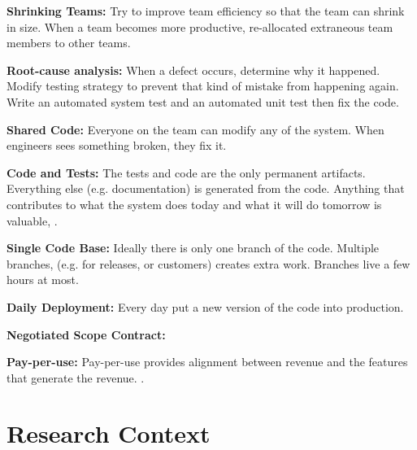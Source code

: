 \textbf{Shrinking Teams:} Try to improve team efficiency so that the team can shrink in size. When a team becomes more productive, re-allocated extraneous team members to other teams.




\textbf{Root-cause analysis:} When a defect occurs, determine why it happened. Modify testing strategy to prevent that kind of mistake from happening again. Write an automated system test and an automated unit test then fix the code. 


\textbf{Shared Code:} Everyone on the team can modify any of the system. When engineers sees something broken, they fix it.


\textbf{Code and Tests:} The tests and code are the only permanent artifacts. Everything else (e.g. documentation) is generated from the code. Anything that contributes to what the system does today and what it will do tomorrow is valuable,  
\cite{BeckExtremeProgramming2004}.


\textbf{Single Code Base:} Ideally there is only one branch of the code. Multiple branches, (e.g. for releases, or customers) creates extra work. Branches live a few hours at most.


\textbf{Daily Deployment:} Every day put a new version of the code into production. 


\textbf{Negotiated Scope Contract:}  




\textbf{Pay-per-use:} Pay-per-use provides alignment between revenue and the features that generate the revenue.   \cite{BeckExtremeProgramming2004}.




















\chapter{Research Context}
\label{ResearchContextChapter}


